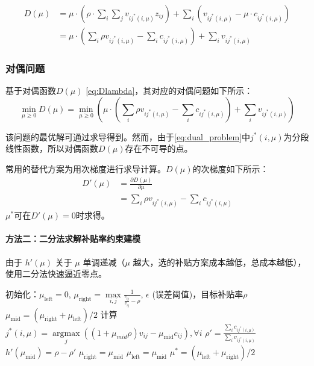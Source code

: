 \begin{equation}\label{eq:Dlambda}
\begin{aligned}
D(\mu)&=\mu \cdot (\rho \cdot \sum_{i}\sum_{j} v_{ij^*(i,\mu)} z_{ij} ) + \sum_i(v_{ij^*(i,\mu)}-\mu \cdot c_{ij^*(i,\mu)})\\
&= \mu \cdot \left( \sum_i\rho v_{ij^*(i,\mu)}-\sum_{i} c_{ij^*(i,\mu)} \right) + \sum_{i} v_{ij^*(i,\mu)}
\end{aligned}
\end{equation}

\subsubsection{对偶问题}
基于对偶函数$D(\mu)$ \eqref{eq:Dlambda}，其对应的对偶问题如下所示：
\begin{equation}\label{eq:dual_problem}
\min_{\mu \ge 0} D(\mu)
=\min_{\mu \ge0}\left(\mu \cdot \left(\sum_i\rho v_{ij^*(i,\mu)}-\sum_ic_{ij^*(i,\mu)}\right)+\sum_iv_{ij^*(i,\mu)}\right)
\end{equation}

该问题的最优解可通过求导得到。然而，由于\eqref{eq:dual_problem}中$j^*(i,\mu)$为分段线性函数，所以对偶函数$D(\mu)$存在不可导的点。

常用的替代方案为用次梯度进行求导计算\citep{boyd2004convex}。$D(\mu)$的次梯度如下所示：
\begin{align}
D'(\mu) &= \frac{\partial D(\mu)}{\partial \mu} \\
&=  \sum_i\rho v_{ij^*(i,\mu)}-\sum_{i} c_{ij^*(i,\mu)}
\end{align}
$\mu^*$可在$D'(\mu)=0$时求得。
\paragraph{方法二：二分法求解补贴率约束建模}
由于 $h'(\mu)$ 关于 $\mu$ 单调递减（$\mu$ 越大，选的补贴方案成本越低，总成本越低），使用二分法快速逼近零点。

\begin{algorithm}[H]
\caption{二分法求解 $\mu^*$}
\begin{algorithmic}[1]
\State 初始化：$\mu_{\text{left}}=0$, $\mu_{\text{right}}= \max\limits_{i,j}\frac{1}{\frac{c_{ij}}{v_{ij}}-\rho}$, $\epsilon$ (误差阈值)，目标补贴率$\rho$
    \State $\mu_{\text{mid}} = (\mu_{\text{right}} + \mu_{\text{left}})/2$
    \State 计算 $j^*(i,\mu) = \underset{j}{\operatorname{argmax}} \left( (1+\mu_{mid}\rho)v_{ij} - \mu_{\text{mid}} c_{ij} \right), \forall i$
    \State $\rho' = \frac{\sum_i c_{ij^*(i,\mu)}}{\sum_iv_{ij^*(i,\mu)}}$
    \State $h'(\mu_{\text{mid}}) =   \rho -\rho' $
        \State $\mu_{\text{right}} = \mu_{\text{mid}}$ 
    \Else
        \State $\mu_{\text{left}} = \mu_{\text{mid}}$  
    \EndIf
\EndWhile
\State \Return $\mu^* = (\mu_{\text{left}} + \mu_{\text{right}})/2$
\end{algorithmic}
\end{algorithm}